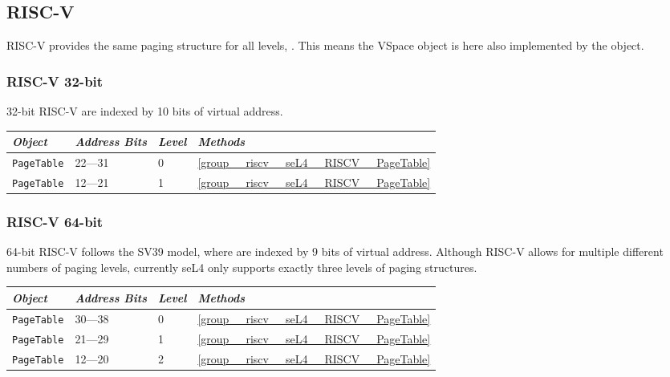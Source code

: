 \subsection{RISC-V}

RISC-V provides the same paging structure for all levels, . This means the VSpace
object is here also implemented by the  object.

\subsubsection{RISC-V 32-bit}

32-bit RISC-V  are indexed by 10 bits of virtual address.

\begin{tabularx}{\textwidth}{Xlll} \toprule
\emph{Object}          & \emph{Address Bits} & \emph{Level} & \emph{Methods} \\ \midrule
\texttt{PageTable}     & 22---31             & 0            & \autoref{group__riscv__seL4__RISCV__PageTable} \\
\texttt{PageTable}     & 12---21             & 1            & \autoref{group__riscv__seL4__RISCV__PageTable} \\
\bottomrule
\end{tabularx}

\subsubsection{RISC-V 64-bit}

64-bit RISC-V follows the SV39 model, where  are indexed by 9 bits of virtual address.
Although RISC-V allows
for multiple different numbers of paging levels, currently seL4 only supports exactly three levels
of paging structures.

\begin{tabularx}{\textwidth}{Xlll} \toprule
\emph{Object}          & \emph{Address Bits} & \emph{Level} & \emph{Methods} \\ \midrule
\texttt{PageTable}     & 30---38             & 0            & \autoref{group__riscv__seL4__RISCV__PageTable} \\
\texttt{PageTable}     & 21---29             & 1            & \autoref{group__riscv__seL4__RISCV__PageTable} \\
\texttt{PageTable}     & 12---20             & 2            & \autoref{group__riscv__seL4__RISCV__PageTable} \\
\bottomrule
\end{tabularx}

